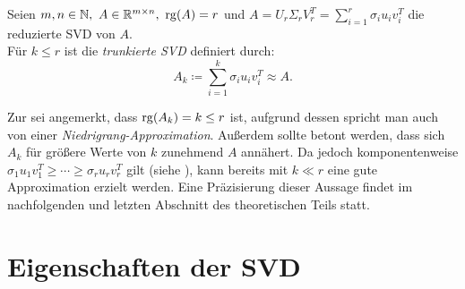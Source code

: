 \begin{definition}\label{df:trunsvd}
    Seien \(m,n \in \N,\ A \in \R^{m \times n},\ \rg(A)=r\) und \(A=U_r \Sigma_r V^{T}_r = \sum_{i=1}^{r} \sigma_i u_i v^{T}_i\) die reduzierte SVD von \(A\). \\
    Für \(k \leq r\) ist die \textit{trunkierte SVD} definiert durch:
    \begin{equation*}
        A_{k} \coloneq \sum_{i=1}^{k} \sigma_i u_i v^{T}_i \approx A.
    \end{equation*}
\end{definition}
Zur  sei angemerkt, dass \(\operatorname{rg}(A_k)=k \leq r\) ist, aufgrund dessen spricht man auch von einer \emph{Niedrigrang-Approximation}.
Außerdem sollte betont werden, dass sich \(A_k\) für größere Werte von \(k\) zunehmend \(A\) annähert.
Da jedoch komponentenweise \(\sigma_1 u_1 v^{T}_1 \geq \cdots \geq \sigma_r u_r v^{T}_r\) gilt (siehe ), kann bereits mit \(k \ll r\) eine gute Approximation erzielt werden.
Eine Präzisierung dieser Aussage findet im nachfolgenden und letzten Abschnitt des theoretischen Teils statt.

\section{Eigenschaften der SVD}

